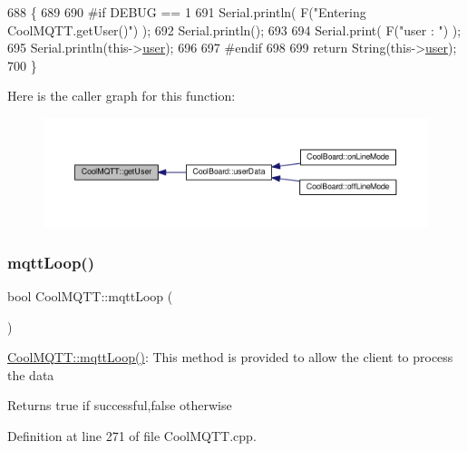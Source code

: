 \begin{DoxyCode}
688 \{
689 
690 \textcolor{preprocessor}{#if DEBUG == 1 }
691     Serial.println( F(\textcolor{stringliteral}{"Entering CoolMQTT.getUser()"}) );
692     Serial.println();
693     
694     Serial.print( F(\textcolor{stringliteral}{"user : "}) );
695     Serial.println(this->\hyperlink{class_cool_m_q_t_t_a8cd47e45d457f908d4b4390b35aaee83}{user});
696 
697 \textcolor{preprocessor}{#endif}
698 
699     \textcolor{keywordflow}{return} String(this->\hyperlink{class_cool_m_q_t_t_a8cd47e45d457f908d4b4390b35aaee83}{user});
700 \}
\end{DoxyCode}
Here is the caller graph for this function\+:\nopagebreak
\begin{figure}[H]
\begin{center}
\leavevmode
\includegraphics[width=350pt]{d0/dd0/class_cool_m_q_t_t_a373cc92fca7760d886f02d8a6e5b3f63_icgraph}
\end{center}
\end{figure}
\mbox{\label{class_cool_m_q_t_t_aa5eaae967b562b62cbcf2b8d81f6e5d5}} 
\subsubsection{\texorpdfstring{mqtt\+Loop()}{mqttLoop()}}
{\footnotesize\ttfamily bool Cool\+M\+Q\+T\+T\+::mqtt\+Loop (\begin{DoxyParamCaption}{ }\end{DoxyParamCaption})}

\hyperlink{class_cool_m_q_t_t_aa5eaae967b562b62cbcf2b8d81f6e5d5}{Cool\+M\+Q\+T\+T\+::mqtt\+Loop()}\+: This method is provided to allow the client to process the data

\begin{DoxyReturn}{Returns}
true if successful,false otherwise 
\end{DoxyReturn}


Definition at line 271 of file Cool\+M\+Q\+T\+T.\+cpp.


